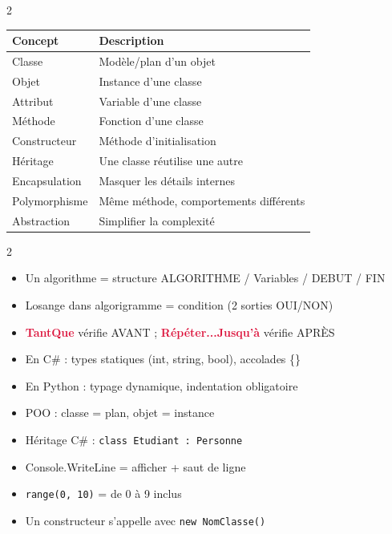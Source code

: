 \documentclass[a4paper,10pt]{article}
\newcommand{\warn}[1]{\textbf{\textcolor{crimson}{#1}}}
\begin{document}
\begin{multicols}{2}
\begin{tcolorbox}[basebox, colframe=crimson, title=10. Concepts fondamentaux POO]
\begin{tabular}{ll}
\toprule
\textbf{Concept} & \textbf{Description} \\
\midrule
Classe & Modèle/plan d'un objet \\
Objet & Instance d'une classe \\
Attribut & Variable d'une classe \\
Méthode & Fonction d'une classe \\
Constructeur & Méthode d'initialisation \\
Héritage & Une classe réutilise une autre \\
Encapsulation & Masquer les détails internes \\
Polymorphisme & Même méthode, comportements différents \\
Abstraction & Simplifier la complexité \\
\bottomrule
\end{tabular}
\end{tcolorbox}

\end{multicols}

\vspace{4pt}
\begin{tcolorbox}[basebox, colframe=teal, title=Points clés à retenir pour l'examen]
\begin{multicols}{2}
\begin{itemize}
  \item Un algorithme = structure ALGORITHME / Variables / DEBUT / FIN
  \item Losange dans algorigramme = condition (2 sorties OUI/NON)
  \item \warn{TantQue} vérifie AVANT ; \warn{Répéter...Jusqu'à} vérifie APRÈS
  \item En C\# : types statiques (int, string, bool), accolades \{\}
  \item En Python : typage dynamique, indentation obligatoire
  \item POO : classe = plan, objet = instance
  \item Héritage C\# : \texttt{class Etudiant : Personne}
  \item Console.WriteLine = afficher + saut de ligne
  \item \texttt{range(0, 10)} = de 0 à 9 inclus
  \item Un constructeur s'appelle avec \texttt{new NomClasse()}
\end{itemize}
\end{multicols}
\end{tcolorbox}
\end{document}
